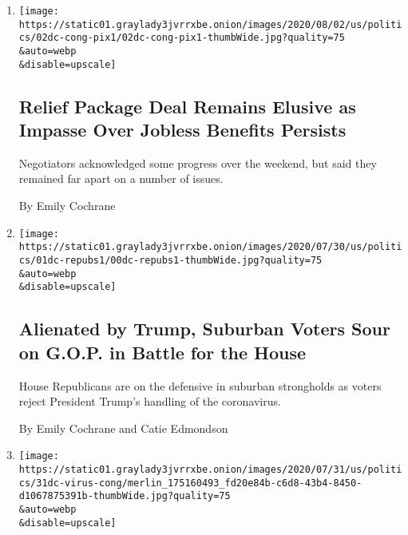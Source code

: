 \begin{enumerate}
\def\labelenumi{\arabic{enumi}.}
\item
  \href{/2020/08/02/us/politics/coronavirus-jobless-aid.html}{}

  \texttt{[image: https://static01.graylady3jvrrxbe.onion/images/2020/08/02/us/politics/02dc-cong-pix1/02dc-cong-pix1-thumbWide.jpg?quality=75\\\&auto=webp\\\&disable=upscale]}

  \hypertarget{relief-package-deal-remains-elusive-as-impasse-over-jobless-benefits-persists}{%
  \subsection{Relief Package Deal Remains Elusive as Impasse Over
  Jobless Benefits
  Persists}\label{relief-package-deal-remains-elusive-as-impasse-over-jobless-benefits-persists}}

  Negotiators acknowledged some progress over the weekend, but said they
  remained far apart on a number of issues.

  By Emily Cochrane
\item
  \href{/2020/08/01/us/politics/trump-suburban-voters-republicans-house.html}{}

  \texttt{[image: https://static01.graylady3jvrrxbe.onion/images/2020/07/30/us/politics/01dc-repubs1/00dc-repubs1-thumbWide.jpg?quality=75\\\&auto=webp\\\&disable=upscale]}

  \hypertarget{alienated-by-trump-suburban-voters-sour-on-gop-in-battle-for-the-house}{%
  \subsection{Alienated by Trump, Suburban Voters Sour on G.O.P. in
  Battle for the
  House}\label{alienated-by-trump-suburban-voters-sour-on-gop-in-battle-for-the-house}}

  House Republicans are on the defensive in suburban strongholds as
  voters reject President Trump's handling of the coronavirus.

  By Emily Cochrane and Catie Edmondson
\item
  \href{/2020/07/31/us/politics/white-house-congress-relief-plan-jobless-aid.html}{}

  \texttt{[image: https://static01.graylady3jvrrxbe.onion/images/2020/07/31/us/politics/31dc-virus-cong/merlin\_175160493\_fd20e84b-c6d8-43b4-8450-d1067875391b-thumbWide.jpg?quality=75\\\&auto=webp\\\&disable=upscale]}

  \hypertarget{white-house-and-congress-clash-on-relief-plan-as-jobless-aid-expires}{%
}
\end{enumerate}
